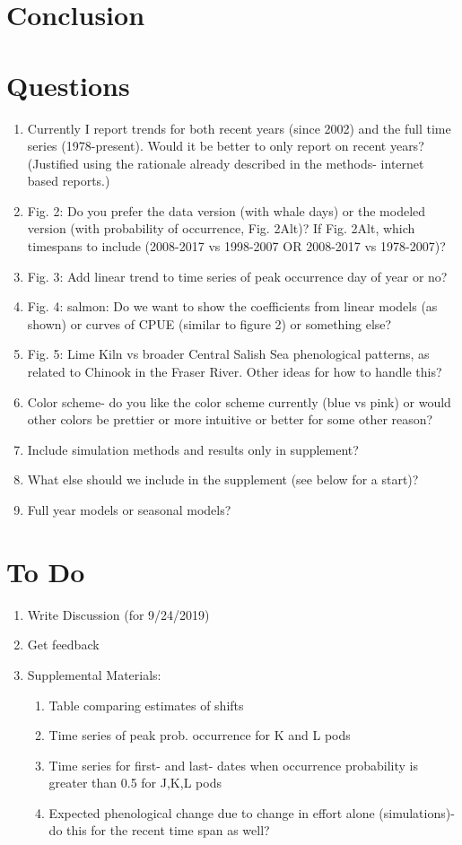 \documentclass{article}
\begin{document}
\section*{Conclusion}

\section*{Questions}

\begin{enumerate}
\item Currently I report trends for both recent years (since 2002) and the full time series (1978-present). Would it be better to only report on recent years? (Justified using the rationale already described in the methods- internet based reports.)
\item Fig. 2: Do you prefer the data version (with whale days) or the modeled version (with probability of occurrence, Fig. 2Alt)? If Fig. 2Alt, which timespans to include (2008-2017 vs 1998-2007 OR 2008-2017 vs 1978-2007)?
\item Fig. 3: Add linear trend to time series of peak occurrence day of year or no?
\item Fig. 4: salmon: Do we want to show the coefficients from linear models (as shown) or curves of CPUE (similar to figure 2) or something else?
\item Fig. 5: Lime Kiln vs broader Central Salish Sea phenological patterns, as related to Chinook in the Fraser River. Other ideas for how to handle this?
\item Color scheme- do you like the color scheme currently (blue vs pink) or would other colors be prettier or more intuitive or better for some other reason?
\item Include simulation methods and results only in supplement?
\item What else should we include in the supplement (see below for a start)?
\item Full year models or seasonal models?

\end{enumerate}
\section*{To Do}
\begin{enumerate}
\item Write Discussion (for 9/24/2019)
\item Get feedback
\item Supplemental Materials:
\begin{enumerate}
\item Table comparing estimates of shifts
\item Time series of peak prob. occurrence for K and L pods
\item Time series for first- and last- dates when occurrence probability is greater than 0.5 for J,K,L pods
\item Expected phenological change due to change in effort alone (simulations)- do this for the recent time span as well?

\end{enumerate}
\end{enumerate}

\end{document}
